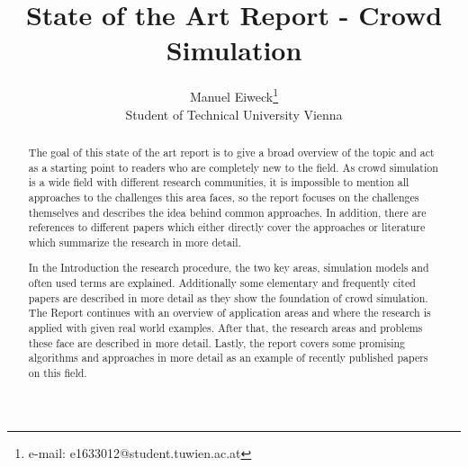 \documentclass{acmsiggraph}               %
\title{State of the Art Report - Crowd Simulation}
\author{Manuel Eiweck\thanks{e-mail: e1633012@student.tuwien.ac.at}\\ Student of Technical University Vienna}
\begin{document}


\maketitle


\begin{abstract}
The goal of this state of the art report is to give a broad overview of the topic and act as a starting point to readers who are completely new to the field. As crowd simulation is a wide field with different research communities, it is impossible to mention all approaches to the challenges this area faces, so the report focuses on the challenges themselves and describes the idea behind common approaches. In addition, there are references to different papers which either directly cover the approaches or literature which summarize the research in more detail.

In the Introduction the research procedure, the two key areas, simulation models and often used terms are explained. Additionally some elementary and frequently cited papers are described in more detail as they show the foundation of crowd simulation. The Report continues with an overview of application areas and where the research is applied with given real world examples. After that, the research areas and problems these face are described in more detail. Lastly, the report covers some promising algorithms and approaches in more detail as an example of recently published papers on this field.
\end{abstract}

\end{document}
